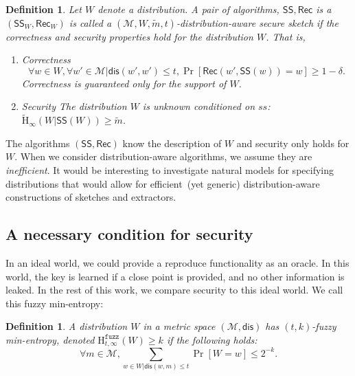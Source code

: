 \documentclass[11pt]{article}
\newcommand{\class}[1]{{\ensuremath{\mathsf{#1}}}}
\newcommand{\sketch}{\ensuremath{\class{SS}}\xspace}
\newcommand{\rec}{\ensuremath{\class{Rec}}\xspace}
\newcommand{\dis}{\ensuremath{\mathsf{dis}}}
\newcommand{\Hav}{\tilde{\mathrm{H}}_\infty}
\newcommand{\Hfuzz}{\mathrm{H}^{\mathtt{fuzz}}_{t,\infty}}
\newtheorem{definition}[theorem]{Definition}
\begin{document}
\begin{definition}
Let $W$ denote a distribution.  A pair of algorithms, $\sketch, \rec$ is a $(\sketch_W, \rec_W)$ is called a $(\mathcal{M}, W, \tilde{m}, t)$-\emph{distribution-aware secure sketch} if the correctness and security properties hold for the distribution $W$.  That is, 
\begin{enumerate}
\item \emph{Correctness} 
\[
\forall w\in W, \forall w' \in\mathcal{M}| \dis(w',w')\le t, \Pr[\rec(w',\sketch(w))=w]\ge 1-\delta.\]
Correctness is guaranteed only for the support of $W$.
\item \emph{Security} The distribution $W$ is unknown conditioned on $ss$: $\Hav(W|\sketch(W))\geq \tilde{m}$.
\end{enumerate}
\end{definition}
The algorithms $(\sketch, \rec)$ know the description of $W$ and security only holds for $W$.  When we consider distribution-aware algorithms, we assume they are \emph{inefficient}.  It would be interesting to investigate natural models for specifying distributions that would allow for efficient~(yet generic) distribution-aware constructions of sketches and extractors.

\subsection{A necessary condition for security}
\label{sec:minimal conditions}

In an ideal world, we could provide a reproduce functionality as an oracle.  In this world, the key is learned if a close point is provided, and no other information is leaked.  In the rest of this work, we compare security to this ideal world.  We call this fuzzy min-entropy:

\begin{definition}
\label{def:fuzzy min-ent}
A distribution $W$ in a metric space $(\mathcal{M}, \dis)$ has $(t, k)$-fuzzy min-entropy, denoted $\Hfuzz(W) \ge k$ if the following holds:
\[
\forall m\in \mathcal{M},  \sum_{w\in W | \dis(w, m)\le t} \Pr[W=w] \leq 2^{-k}.
\]
\end{definition}
\end{document}
